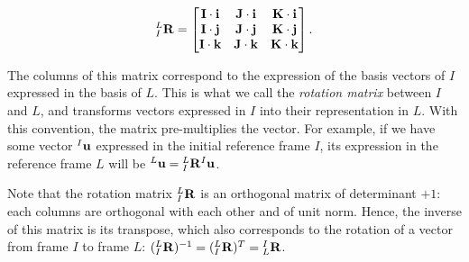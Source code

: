 \begin{equation}
{}_{I}^{L}\textrm{\textbf{R}} = 
\begin{bmatrix}  \textrm{\textbf{I}}\cdot\textrm{\textbf{i}} & \textrm{\textbf{J}}\cdot\textrm{\textbf{i}}  & \textrm{\textbf{K}}\cdot\textrm{\textbf{i}}\\
                \textrm{\textbf{I}}\cdot\textrm{\textbf{j}} &\textrm{\textbf{J}}\cdot\textrm{\textbf{j}}  & \textrm{\textbf{K}}\cdot\textrm{\textbf{j}} \\
				\textrm{\textbf{I}}\cdot\textrm{\textbf{k}} & \textrm{\textbf{J}}\cdot\textrm{\textbf{k}}  & \textrm{\textbf{K}}\cdot\textrm{\textbf{k}}
\end{bmatrix}.
\end{equation}

The columns of this matrix correspond to the expression of the basis vectors of $I$ expressed in the basis of $L$. This is what we call the \textit{rotation matrix} between $I$ and $L$, and transforms vectors expressed in $I$ into their representation in $L$. With this convention, the matrix pre-multiplies the vector. For example, if we have some vector ${}_{}^{I}\textrm{\textbf{u}}$ expressed in the initial reference frame $I$, its expression in the reference frame $L$ will be ${}_{}^{L}\textrm{\textbf{u}} = {}_{I}^{L}\textrm{\textbf{R}} {}_{}^{I}\textrm{\textbf{u}}$.


Note that the rotation matrix ${}_{I}^{L}\textrm{\textbf{R}}$ is an orthogonal matrix of determinant $+1$: each columns are orthogonal with each other and of unit norm. Hence, the inverse of this matrix is its transpose, which also corresponds to the rotation of a vector from frame $I$ to frame $L$: $({}_{I}^{L}\textrm{\textbf{R}})^{-1} = ({}_{I}^{L}\textrm{\textbf{R}})^T = {}_{L}^{I}\textrm{\textbf{R}}$.


